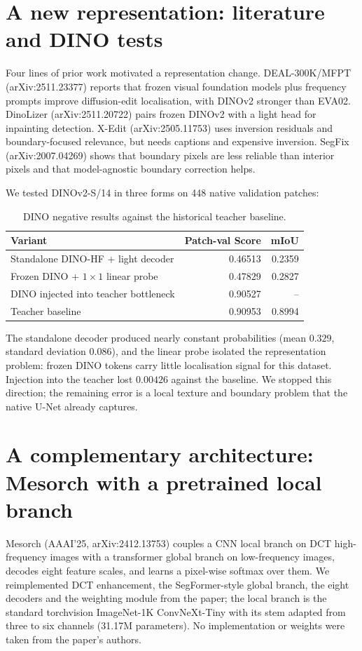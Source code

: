 \documentclass[10pt]{article}
\begin{document}
\section{A new representation: literature and DINO tests}
\label{sec:dino}
Four lines of prior work motivated a representation change. DEAL-300K/MFPT (arXiv:2511.23377) reports that frozen visual foundation models plus frequency prompts improve diffusion-edit localisation, with DINOv2 stronger than EVA02. DinoLizer (arXiv:2511.20722) pairs frozen DINOv2 with a light head for inpainting detection. X-Edit (arXiv:2505.11753) uses inversion residuals and boundary-focused relevance, but needs captions and expensive inversion. SegFix (arXiv:2007.04269) shows that boundary pixels are less reliable than interior pixels and that model-agnostic boundary correction helps.

We tested DINOv2-S/14 in three forms on 448 native validation patches:
\begin{table}[htbp]\centering\footnotesize
\caption{DINO negative results against the historical teacher baseline.}
\begin{tabular}{lrr}
\toprule Variant & Patch-val Score & mIoU \\
\midrule
Standalone DINO-HF + light decoder & 0.46513 & 0.2359 \\
Frozen DINO + $1\times1$ linear probe & 0.47829 & 0.2827 \\
DINO injected into teacher bottleneck & 0.90527 & -- \\
Teacher baseline & 0.90953 & 0.8994 \\
\bottomrule
\end{tabular}
\end{table}
The standalone decoder produced nearly constant probabilities (mean $0.329$, standard deviation $0.086$), and the linear probe isolated the representation problem: frozen DINO tokens carry little localisation signal for this dataset. Injection into the teacher lost $0.00426$ against the baseline. We stopped this direction; the remaining error is a local texture and boundary problem that the native U-Net already captures.

\section{A complementary architecture: Mesorch with a pretrained local branch}
\label{sec:mesorch}
Mesorch (AAAI'25, arXiv:2412.13753) couples a CNN local branch on DCT high-frequency images with a transformer global branch on low-frequency images, decodes eight feature scales, and learns a pixel-wise softmax over them. We reimplemented DCT enhancement, the SegFormer-style global branch, the eight decoders and the weighting module from the paper; the local branch is the standard torchvision ImageNet-1K ConvNeXt-Tiny with its stem adapted from three to six channels (31.17M parameters). No implementation or weights were taken from the paper's authors.
\end{document}
